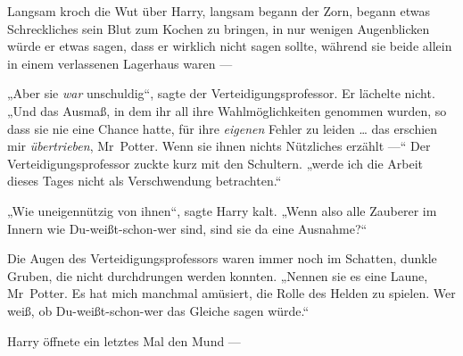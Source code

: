 Langsam kroch die Wut über Harry, langsam begann der Zorn, begann etwas Schreckliches sein Blut zum Kochen zu bringen, in nur wenigen Augenblicken würde er etwas sagen, dass er wirklich nicht sagen sollte, während sie beide allein in einem verlassenen Lagerhaus waren —

„Aber sie \emph{war} unschuldig“, sagte der Verteidigungsprofessor. Er lächelte nicht.
„Und das Ausmaß, in dem ihr all ihre Wahlmöglichkeiten genommen wurden, so dass sie nie eine Chance hatte, für ihre \emph{eigenen} Fehler zu leiden … das erschien mir \emph{übertrieben}, Mr~Potter. Wenn sie ihnen nichts Nützliches erzählt —“ Der Verteidigungsprofessor zuckte kurz mit den Schultern. „werde ich die Arbeit dieses Tages nicht als Verschwendung betrachten.“

„Wie uneigennützig von ihnen“, sagte Harry kalt.
„Wenn also alle Zauberer im Innern wie Du-weißt-schon-wer sind, sind sie da eine Ausnahme?“

Die Augen des Verteidigungsprofessors waren immer noch im Schatten, dunkle Gruben, die nicht durchdrungen werden konnten.
„Nennen sie es eine Laune, Mr~Potter. Es hat mich manchmal amüsiert, die Rolle des Helden zu spielen. Wer weiß, ob Du-weißt-schon-wer das Gleiche sagen würde.“

Harry öffnete ein letztes Mal den Mund —

